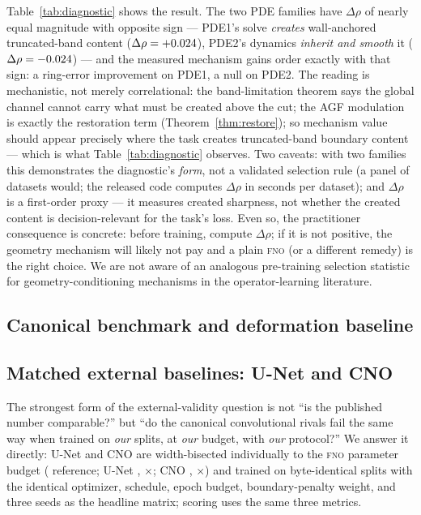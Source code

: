 \documentclass[11pt]{article}
\theoremstyle{definition}
\newcommand{\fno}{\textsc{fno}}
\begin{document}
Table~\ref{tab:diagnostic} shows the result. The two PDE families have
$\Delta\rho$ of nearly equal magnitude with opposite sign --- PDE1's solve
\emph{creates} wall-anchored truncated-band content ($\Delta\rho =
+0.024$), PDE2's dynamics \emph{inherit and smooth} it
($\Delta\rho = -0.024$) --- and the measured mechanism gains order
exactly with that sign: a \DiagGainPdeOneRingRed{} ring-error improvement on
PDE1, a null \DiagGainPdeTwoRingRed{} on PDE2. The reading is mechanistic,
not merely correlational: the band-limitation theorem says the global
channel cannot carry what must be created above the cut; the AGF modulation
is exactly the restoration term (Theorem~\ref{thm:restore}); so mechanism
value should appear precisely where the task creates truncated-band
boundary content --- which is what Table~\ref{tab:diagnostic} observes.
Two caveats: with two families this demonstrates the diagnostic's
\emph{form}, not a validated selection rule (a panel of datasets would;
the released code computes $\Delta\rho$ in seconds per dataset); and
$\Delta\rho$ is a first-order proxy --- it measures created sharpness, not
whether the created content is decision-relevant for the task's loss.
Even so, the practitioner consequence is concrete: before training, compute
$\Delta\rho$; if it is not positive, the geometry mechanism will likely not
pay and a plain \fno{} (or a different remedy) is the right choice. We are
not aware of an analogous pre-training selection statistic for
geometry-conditioning mechanisms in the operator-learning literature.

\subsection{Canonical benchmark and deformation baseline}
\label{sec:benchmark}
\label{sec:external}

\ifdefined\UNetRelL
\subsection{Matched external baselines: U-Net and CNO}
\label{sec:baselines}

The strongest form of the external-validity question is not ``is the
published number comparable?'' but ``do the canonical convolutional
rivals fail the same way when trained on \emph{our} splits, at \emph{our}
budget, with \emph{our} protocol?'' We answer it directly: U-Net
\citep{ronneberger2015unet} and CNO \citep{raonic2024cno} are width-bisected
individually to the \fno{} parameter budget (
reference; U-Net , \UNetParamsRatio$\times$; CNO ,
\CNOParamsRatio$\times$) and trained on byte-identical splits with the
identical optimizer, schedule, epoch budget, boundary-penalty weight, and
three seeds as the headline matrix; scoring uses the same three metrics.
\end{document}
